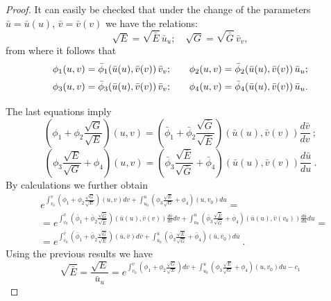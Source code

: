 \documentclass[10pt,a4paper]{amsart}
\newcommand{\ds}{\displaystyle}
\begin{document}
\begin{proof}
	
	It can easily be checked that  under the change of the parameters $\bar u=\bar u(u)$, $\bar v= \bar v(v) $ we have the relations:
	$$\sqrt {E} = \sqrt {\bar E} \, {\bar u}_u; \quad \sqrt {G} = \sqrt {\bar G} \, {\bar v}_v,$$
	from where it follows that
	\begin{equation*} 
		\begin{array}{ll} 
			\vspace{2mm}
			\phi_1 (u,v) = {\bar \phi_1} (\bar u(u),\bar v(v)) \, {\bar v}_v;  & \quad \phi_2 (u,v) = {\bar \phi_2} (\bar u(u),\bar v(v)) \, {\bar u}_u;  \\
			\vspace{2mm}
			\phi_3 (u,v) = {\bar \phi_3} (\bar u(u),\bar v(v)) \, {\bar v}_v;  & \quad \phi_4 (u,v) = {\bar \phi_4} (\bar u(u),\bar v(v)) \, {\bar u}_u.
		\end{array}   
	\end{equation*}
The last equations imply 
	$$
	\ds (\phi_1+\phi_2\frac{\sqrt {G}}{\sqrt {E}})(u,v)=(\bar \phi_1+\bar \phi_2\frac{\sqrt {\bar G}}{\sqrt {\bar E}})(\bar u(u),\bar v(v))\frac{d\bar v}{dv} \ ;
	$$
	$$
	\ds (\phi_3\frac{\sqrt {E}}{\sqrt {G}}+\phi_4)(u,v)=(\bar \phi_3\frac{\sqrt {\bar E}}{\sqrt {\bar G}}+\bar \phi_4)(\bar u(u),\bar v(v))\frac{d\bar u}{du} \ .
	$$
By calculations we further obtain
	\begin{equation}\label{eq:3.6}
		\begin{split}
			& e^{\ds\int_{v_0}^v\left(\phi_1+\phi_2\frac{\sqrt G}{\sqrt E}\right)(u,v)dv
				+\int_{u_0}^u\left(\phi_3\frac{\sqrt {E}}{\sqrt {G}}+\phi_4\right)(u,v_0)du} = \\
			& =e^{\ds\int_{v_0}^v\left(\bar \phi_1+\bar \phi_2\frac{\sqrt {\bar G}}{\sqrt {\bar E}}\right)(\bar u(u),\bar v(v))\frac{d\bar v}{dv}{dv}
				+\int_{u_0}^u\left(\bar \phi_3\frac{\sqrt {\bar E}}{\sqrt {\bar G}}+\bar \phi_4\right)(\bar u(u),\bar v(v_0))\frac{d\bar u}{du}du} = \\
			& =e^{\ds\int_{\bar v_0}^{\bar v}\left(\bar \phi_1+\bar \phi_2\frac{\sqrt {\bar G}}{\sqrt {\bar E}}\right)(\bar u,\bar v)d\bar v
				+\int_{\bar u_0}^{\bar u}\left(\bar \phi_3\frac{\sqrt {\bar E}}{\sqrt {\bar G}}+\bar \phi_4\right)(\bar u,\bar v_0)d\bar u} \ .
		\end{split}
	\end{equation}
		Using the previous results we have
	$$
	\sqrt{\bar E}=\frac{\sqrt{E}}{\bar u_u}=e^{\ds\int_{v_0}^v\left(\phi_1+\phi_2\frac{\sqrt G}{\sqrt E}\right)dv
		+\int_{u_0}^u\left(\phi_3\frac{\sqrt {E}}{\sqrt {G}}+\phi_4\right)(u,v_0)du-c_1}
	$$
	

\end{proof}
\end{document}
